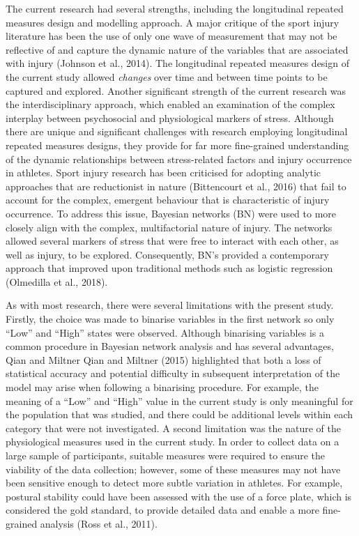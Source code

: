 \documentclass[
  english,
  man]{apa6}
\begin{document}
The current research had several strengths, including the longitudinal repeated measures design and modelling approach.
A major critique of the sport injury literature has been the use of only one wave of measurement that may not be reflective of and capture the dynamic nature of the variables that are associated with injury (Johnson et al., 2014).
The longitudinal repeated measures design of the current study allowed \emph{changes} over time and between time points to be captured and explored.
Another significant strength of the current research was the interdisciplinary approach, which enabled an examination of the complex interplay between psychosocial and physiological markers of stress.
Although there are unique and significant challenges with research employing longitudinal repeated measures designs, they provide for far more fine-grained understanding of the dynamic relationships between stress-related factors and injury occurrence in athletes.
Sport injury research has been criticised for adopting analytic approaches that are reductionist in nature (Bittencourt et al., 2016) that fail to account for the complex, emergent behaviour that is characteristic of injury occurrence.
To address this issue, Bayesian networks (BN) were used to more closely align with the complex, multifactorial nature of injury.
The networks allowed several markers of stress that were free to interact with each other, as well as injury, to be explored.
Consequently, BN's provided a contemporary approach that improved upon traditional methods such as logistic regression (Olmedilla et al., 2018).

As with most research, there were several limitations with the present study.
Firstly, the choice was made to binarise variables in the first network so only ``Low'' and ``High'' states were observed.
Although binarising variables is a common procedure in Bayesian network analysis and has several advantages, Qian and Miltner Qian and Miltner (2015) highlighted that both a loss of statistical accuracy and potential difficulty in subsequent interpretation of the model may arise when following a binarising procedure.
For example, the meaning of a ``Low'' and ``High'' value in the current study is only meaningful for the population that was studied, and there could be additional levels within each category that were not investigated.
A second limitation was the nature of the physiological measures used in the current study.
In order to collect data on a large sample of participants, suitable measures were required to ensure the viability of the data collection; however, some of these measures may not have been sensitive enough to detect more subtle variation in athletes.
For example, postural stability could have been assessed with the use of a force plate, which is considered the gold standard, to provide detailed data and enable a more fine-grained analysis (Ross et al., 2011).
\end{document}
